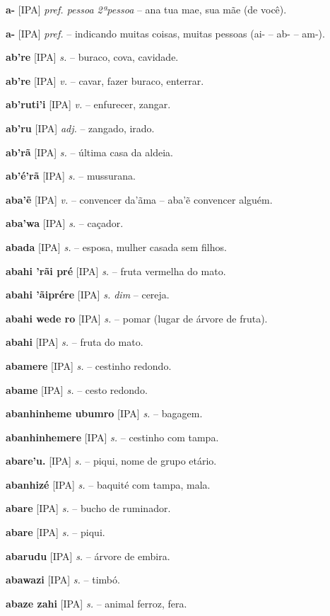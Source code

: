 \textbf{a-} [IPA] \textit{pref. pessoa 2ªpessoa} -- ana tua mae, sua mãe (de você).

\textbf{a-} [IPA] \textit{pref.} -- indicando muitas coisas, muitas pessoas (ai- -- ab- -- am-).

\textbf{ab're} [IPA] \textit{s.} -- buraco, cova, cavidade.

\textbf{ab're} [IPA] \textit{v.} -- cavar, fazer buraco, enterrar.

\textbf{ab'ruti'i} [IPA] \textit{v.} -- enfurecer, zangar.

\textbf{ab'ru} [IPA] \textit{adj.} -- zangado, irado.

\textbf{ab'rã} [IPA] \textit{s.} -- última casa da aldeia.

\textbf{ab'é'rã} [IPA] \textit{s.} -- mussurana.

\textbf{aba'ẽ} [IPA] \textit{v.} -- convencer  da'ãma -- aba'ẽ convencer alguém.

\textbf{aba'wa} [IPA] \textit{s.} -- caçador.

\textbf{abada} [IPA] \textit{s.} -- esposa, mulher casada sem filhos.

\textbf{abahi 'rãi pré} [IPA] \textit{s.} -- fruta vermelha do mato.

\textbf{abahi 'ãiprére} [IPA] \textit{s. dim} -- cereja.

\textbf{abahi wede ro} [IPA] \textit{s.} -- pomar (lugar de árvore de fruta).

\textbf{abahi} [IPA] \textit{s.} -- fruta do mato.

\textbf{abamere} [IPA] \textit{s.} -- cestinho redondo.

\textbf{abame} [IPA] \textit{s.} -- cesto redondo.

\textbf{abanhinheme ubumro} [IPA] \textit{s.} -- bagagem.

\textbf{abanhinhemere} [IPA] \textit{s.} -- cestinho com tampa.

\textbf{abare'u.} [IPA] \textit{s.} -- piqui, nome de grupo etário.

\textbf{abanhizé} [IPA] \textit{s.} -- baquité com tampa, mala.

\textbf{abare} [IPA] \textit{s.} -- bucho de ruminador.

\textbf{abare} [IPA] \textit{s.} -- piqui.

\textbf{abarudu} [IPA] \textit{s.} -- árvore de embira.

\textbf{abawazi} [IPA] \textit{s.} -- timbó.

\textbf{abaze zahi} [IPA] \textit{s.} -- animal ferroz, fera.

